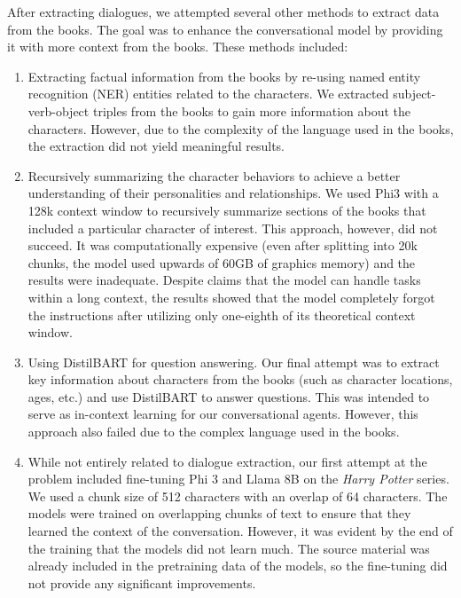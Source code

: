 \documentclass[fleqn,moreauthors,10pt]{ds_report}
\begin{document}
After extracting dialogues, we attempted several other methods to extract data from the books. The goal was to enhance the conversational model by providing it with more context from the books. These methods included:

\begin{enumerate}
	\item Extracting factual information from the books by re-using named entity recognition (NER) entities related to the characters. We extracted subject-verb-object triples from the books to gain more information about the characters. However, due to the complexity of the language used in the books, the extraction did not yield meaningful results.

	\item Recursively summarizing the character behaviors to achieve a better understanding of their personalities and relationships. We used Phi3 with a 128k context window to recursively summarize sections of the books that included a particular character of interest. This approach, however, did not succeed. It was computationally expensive (even after splitting into 20k chunks, the model used upwards of 60GB of graphics memory) and the results were inadequate. Despite claims that the model can handle tasks within a long context, the results showed that the model completely forgot the instructions after utilizing only one-eighth of its theoretical context window.

	\item Using DistilBART for question answering. Our final attempt was to extract key information about characters from the books (such as character locations, ages, etc.) and use DistilBART to answer questions. This was intended to serve as in-context learning for our conversational agents. However, this approach also failed due to the complex language used in the books.

	\item While not entirely related to dialogue extraction, our first attempt at the problem included fine-tuning Phi 3 and Llama 8B on the \textit{Harry Potter} series. We used a chunk size of 512 characters with an overlap of 64 characters. The models were trained on overlapping chunks of text to ensure that they learned the context of the conversation. However, it was evident by the end of the training that the models did not learn much. The source material was already included in the pretraining data of the models, so the fine-tuning did not provide any significant improvements.

\end{enumerate}
\end{document}

